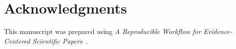 \documentclass[../../main.tex]{subfiles}
\begin{document}
\section{Acknowledgments}

This manuscript was prepared using \emph{A Reproducible Workflow for Evidence-Centered Scientific Papers}~\citep{schmiedmayer2026papertemplate}.

\end{document}
